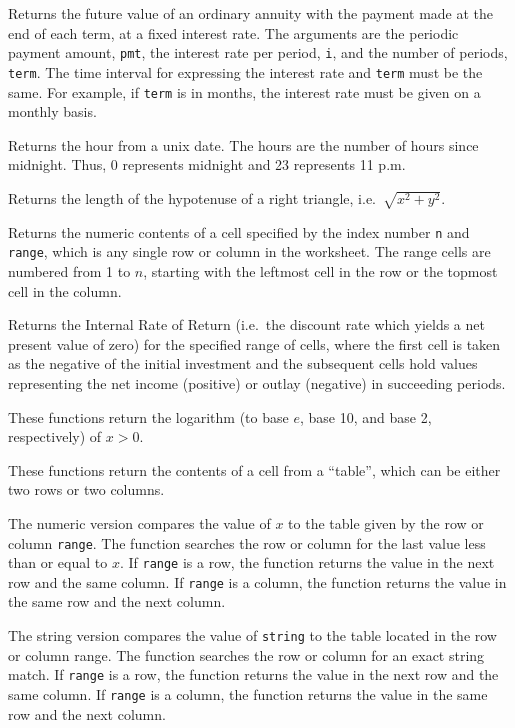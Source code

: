 \documentclass[titlepage]{article}
\begin{document}
 Returns the future value of an ordinary
annuity with the payment made at the end of each term, at a fixed
interest rate.  The arguments are the periodic payment amount,
\texttt{pmt}, the interest rate per period, \texttt{i}, and the number
of periods, \texttt{term}.  The time interval for expressing the
interest rate and \texttt{term} must be the same.  For example, if
\texttt{term} is in months, the interest rate must be given on a
monthly basis.

 Returns the hour from a unix date.  The hours
are the number of hours since midnight.  Thus, 0 represents midnight
and 23 represents 11 p.m.

 Returns the length of the hypotenuse of a right
triangle, i.e.\ $\sqrt{x^2 + y^2}$.

 Returns the numeric contents of a cell
specified by the index number \texttt{n} and \texttt{range}, which is
any single row or column in the worksheet.  The range cells are
numbered from 1 to $n$, starting with the leftmost cell in the row or
the topmost cell in the column.

 Returns the Internal Rate of Return (i.e.\ the
discount rate which yields a net present value of zero) for the
specified range of cells, where the first cell is taken as the
negative of the initial investment and the subsequent cells hold
values representing the net income (positive) or outlay (negative) in
succeeding periods.  
 


 These functions return the logarithm (to base $e$,
base 10, and base 2, respectively) of $x > 0$.


 These functions return the contents of
a cell from a ``table'', which can be either two rows or two columns.

The numeric version compares the value of $x$ to the table given by
the row or column \texttt{range}.  The function searches the row or
column for the last value less than or equal to $x$.  If
\texttt{range} is a row, the function returns the value in the next
row and the same column.  If \texttt{range} is a column, the function
returns the value in the same row and the next column.

The string version compares the value of \texttt{string} to the table
located in the row or column range.  The function searches the row or
column for an exact string match.  If \texttt{range} is a row, the
function returns the value in the next row and the same column.  If
\texttt{range} is a column, the function returns the value in the same
row and the next column.
\end{document}
